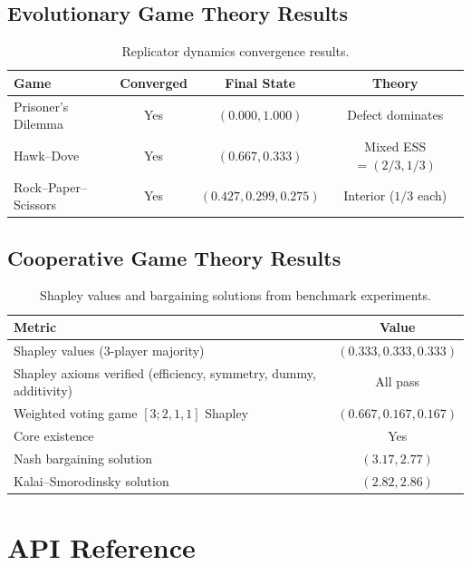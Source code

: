 \documentclass[10pt]{article}
\begin{document}
\subsection{Evolutionary Game Theory Results}

\begin{table}[H]
\centering
\caption{Replicator dynamics convergence results.}
\label{tab:evolutionary}
\begin{tabular}{lccc}
\toprule
\textbf{Game} & \textbf{Converged} & \textbf{Final State} & \textbf{Theory} \\
\midrule
Prisoner's Dilemma & Yes & $(0.000, 1.000)$ & Defect dominates \\
Hawk--Dove & Yes & $(0.667, 0.333)$ & Mixed ESS $= (2/3, 1/3)$ \\
Rock--Paper--Scissors & Yes & $(0.427, 0.299, 0.275)$ & Interior ($1/3$ each) \\
\bottomrule
\end{tabular}
\end{table}

\subsection{Cooperative Game Theory Results}

\begin{table}[H]
\centering
\caption{Shapley values and bargaining solutions from benchmark experiments.}
\label{tab:cooperative}
\begin{tabular}{lc}
\toprule
\textbf{Metric} & \textbf{Value} \\
\midrule
Shapley values (3-player majority) & $(0.333, 0.333, 0.333)$ \\
Shapley axioms verified (efficiency, symmetry, dummy, additivity) & All pass \\
Weighted voting game $[3;2,1,1]$ Shapley & $(0.667, 0.167, 0.167)$ \\
Core existence & Yes \\
Nash bargaining solution & $(3.17, 2.77)$ \\
Kalai--Smorodinsky solution & $(2.82, 2.86)$ \\
\bottomrule
\end{tabular}
\end{table}

\section{API Reference}
\label{app:api}
\end{document}
